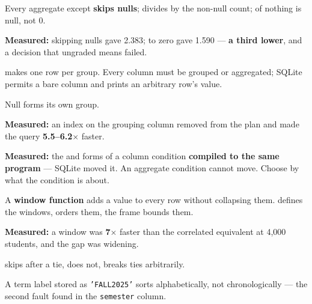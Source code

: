 \begin{chaptersummary}
\begin{tight}
  \item Every aggregate except  \textbf{skips nulls};
         divides by the non-null count;  of nothing is
        null, not 0.
  \item \textbf{Measured:}  skipping nulls gave 2.383;
         to zero gave 1.590 --- \textbf{a third lower}, and a
        decision that ungraded means failed.
  \item {} makes one row per group. Every  column
        must be grouped or aggregated; SQLite permits a bare column and prints
        an arbitrary row's value.
  \item Null forms its own group.
  \item \textbf{Measured:} an index on the grouping column removed
         from the plan and made the query
        \textbf{5.5--6.2$\times$} faster.
  \item \textbf{Measured:} the  and  forms of a
        column condition \textbf{compiled to the same program} --- SQLite
        moved it. An aggregate condition cannot move. Choose by what the
        condition is about.
  \item A \textbf{window function} adds a value to every row without
        collapsing them.  defines the windows,
         orders them, the frame bounds them.
  \item \textbf{Measured:} a window  was \textbf{7$\times$}
        faster than the correlated equivalent at 4{,}000 students, and the gap
        was widening.
  \item {} skips after a tie,  does not,
         breaks ties arbitrarily.
  \item A term label stored as \texttt{'FALL2025'} sorts alphabetically, not
        chronologically --- the second fault found in the \texttt{semester}
        column.
\end{tight}
\end{chaptersummary}

